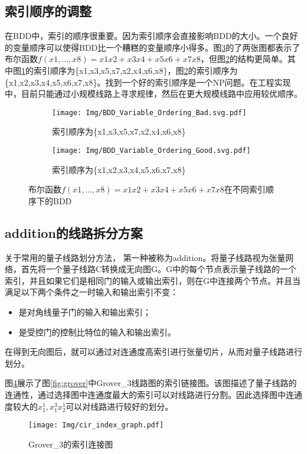 \subsection*{索引顺序的调整}
\label{contraction}在BDD中，索引的顺序很重要。因为索引顺序会直接影响BDD的大小。一个良好的变量顺序可以使得BDD比一个糟糕的变量顺序小得多。图\ref{fig:bdd-compare}的了两张图都表示了布尔函数$f (x1,...,x8)=x1x2+x3x4+x5x6+x7x8$，但图\ref{fig:bdd-good}的结构更简单。其中图\ref{fig:bdd-bad}的索引顺序为\{x1,x3,x5,x7,x2,x4,x6,x8\}，图\ref{fig:bdd-good}的索引顺序为\{x1,x2,x3,x4,x5,x6,x7,x8\}。找到一个好的索引顺序是一个NP问题。在工程实现中，目前只能通过小规模线路上寻求规律，然后在更大规模线路中应用较优顺序。
\begin{figure}[!htbp]
	\centering
	\begin{subfigure}[b]{.4\textwidth}
        \centering
        \texttt{[image: Img/BDD\_Variable\_Ordering\_Bad.svg.pdf]}
		\caption{索引顺序为\{x1,x3,x5,x7,x2,x4,x6,x8\}}
		\label{fig:bdd-bad}
	\end{subfigure}
    \qquad
	\begin{subfigure}[b]{.4\textwidth}
        \centering
        \texttt{[image: Img/BDD\_Variable\_Ordering\_Good.svg.pdf]}
		\caption{索引顺序为\{x1,x2,x3,x4,x5,x6,x7,x8\}}
		\label{fig:bdd-good}
	\end{subfigure}
	\caption{布尔函数$f (x1,...,x8)=x1x2+x3x4+x5x6+x7x8$在不同索引顺序下的BDD\citep{wiki:bdd}}
	\label{fig:bdd-compare}
\end{figure}

\subsection*{addition的线路拆分方案}
\label{addition}关于常用的量子线路划分方法，
第一种被称为addition\citep{chen2018classical}。将量子线路视为张量网络，首先将一个量子线路C转换成无向图G。G中的每个节点表示量子线路的一个索引，并且如果它们是相同门的输入或输出索引，则在G中连接两个节点。并且当满足以下两个条件之一时输入和输出索引不变：
\begin{itemize}
	\item 是对角线量子门的输入和输出索引；
	\item 是受控门的控制比特位的输入和输出索引。
\end{itemize}
在得到无向图后，就可以通过对连通度高索引进行张量切片，从而对量子线路进行划分。 
\begin{example}
    图\ref{fig:addition}展示了图\ref{fig:grover}中Grover\_3线路图的索引链接图。该图描述了量子线路的连通性，通过选择图中连通度最大的索引可以对线路进行分割。因此选择图中连通度较大的$x_1^1,x_1^3x_2^1$可以对线路进行较好的划分。
 
\begin{figure}[!htbp]
	\centering
	\texttt{[image: Img/cir\_index\_graph.pdf]}
	\caption{Grover\_3的索引连接图}
	\label{fig:addition}
\end{figure} 
\end{example}


